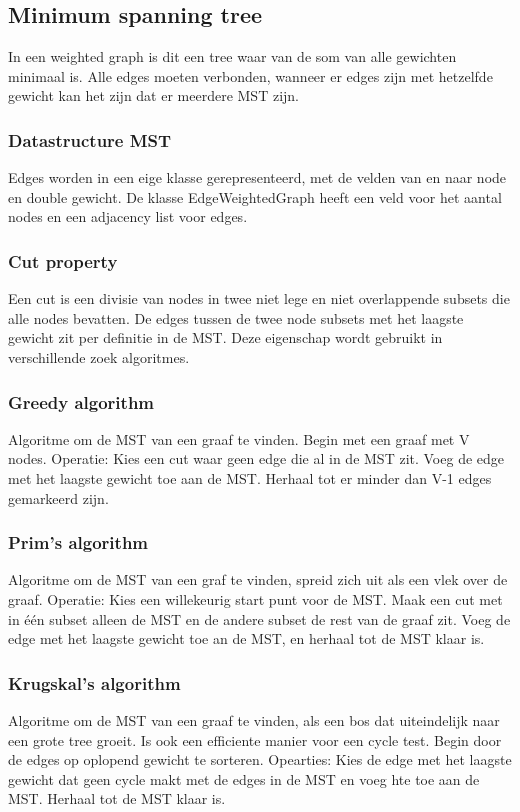 \subsection{Minimum spanning tree}
In een weighted graph is dit een tree waar van de som van alle gewichten minimaal is.
Alle edges moeten verbonden, wanneer er edges zijn met hetzelfde gewicht kan het zijn dat er meerdere MST zijn.

\subsubsection{Datastructure MST}
Edges worden in een eige klasse gerepresenteerd, met de velden van en naar node en double gewicht.
De klasse EdgeWeightedGraph heeft een veld voor het aantal nodes en een adjacency list voor edges.

\subsubsection{Cut property}
Een cut is een divisie van nodes in twee niet lege en niet overlappende subsets die alle nodes bevatten.
De edges tussen de twee node subsets met het laagste gewicht zit per definitie in de MST.
Deze eigenschap wordt gebruikt in verschillende zoek algoritmes.

\subsubsection{Greedy algorithm}
Algoritme om de MST van een graaf te vinden.
Begin met een graaf met V nodes.
Operatie: 
Kies een cut waar geen edge die al in de MST zit.
Voeg de edge met het laagste gewicht toe aan de MST.
Herhaal tot er minder dan V-1 edges gemarkeerd zijn.

\subsubsection{Prim's algorithm}
Algoritme om de MST van een graf te vinden, spreid zich uit als een vlek over de graaf.
Operatie:
Kies een willekeurig start punt voor de MST.
Maak een cut met in \'e\'en subset alleen de MST en de andere subset de rest van de graaf zit.
Voeg de edge met het laagste gewicht toe an de MST, en herhaal tot de MST klaar is.

\subsubsection{Krugskal's algorithm}
Algoritme om de MST van een graaf te vinden, als een bos dat uiteindelijk naar een grote tree groeit.
Is ook een efficiente manier voor een cycle test.
Begin door de edges op oplopend gewicht te sorteren.
Opearties:
Kies de edge met het laagste gewicht dat geen cycle makt met de edges in de MST en voeg hte toe aan de MST.
Herhaal tot de MST klaar is.

